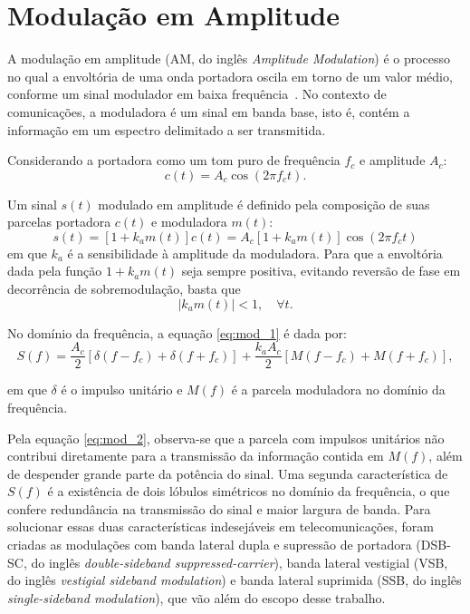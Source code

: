 \section{Modulação em Amplitude}
A modulação em amplitude (AM, do inglês
\textit{Amplitude Modulation}) é o processo no qual a envoltória de uma onda
portadora oscila em torno de um valor médio, conforme um sinal modulador em
baixa frequência~\cite{haykin2008}. No contexto de comunicações, a moduladora é
um sinal em banda base, isto é, contém a informação em um espectro delimitado a
ser transmitida.

Considerando a portadora como um tom puro de frequência $f_c$ e amplitude $A_c$:
\begin{equation}
    c(t) = A_c \cos(2\pi f_c t).
\end{equation}

    Um sinal $s(t)$ modulado em amplitude é definido pela composição de suas
parcelas portadora $c(t)$ e moduladora $m(t)$:
\begin{equation}
    s(t) = [1+k_a m(t)]c(t) = A_c[1+k_a m(t)]\cos(2\pi f_c t) \label{eq:mod_1}
\end{equation}
em que $k_a$ é a sensibilidade à amplitude da moduladora. Para que a envoltória
dada pela função $1+k_a m(t)$ seja sempre positiva, evitando reversão de fase em
decorrência de sobremodulação, basta que
\begin{equation}
    |k_a m(t)| < 1, \quad \forall t.
\end{equation}

No domínio da frequência, a equação \eqref{eq:mod_1} é dada por:
\begin{equation}
    S(f) = \frac{A_c}{2} [\delta (f - f_c) + \delta(f + f_c)] + \frac{k_a A_c}{2} [M(f - f_c) + M (f + f_c)], \label{eq:mod_2}
\end{equation}

em que $\delta$ é o impulso unitário e $M(f)$ é a parcela moduladora no domínio
da frequência.

Pela equação \eqref{eq:mod_2}, observa-se que a parcela com impulsos unitários
não contribui diretamente para a transmissão da informação contida em $M(f)$,
além de despender grande parte da potência do sinal. Uma segunda característica
de $S(f)$ é a existência de dois lóbulos simétricos no domínio da
frequência, o que confere redundância na transmissão do sinal e maior largura de
banda. Para solucionar essas duas características indesejáveis em
telecomunicações, foram criadas as modulações com banda lateral dupla e
supressão de portadora (DSB-SC, do inglês \textit{double-sideband
suppressed-carrier}), banda lateral vestigial (VSB, do inglês \textit{vestigial
sideband modulation}) e banda lateral suprimida (SSB, do inglês
\textit{single-sideband modulation}), que vão além do escopo desse trabalho.

